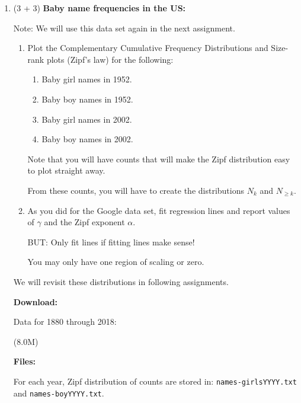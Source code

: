 \begin{enumerate}

   \solutionend


 
\item (3 + 3) 
  \textbf{Baby name frequencies in the US:}

  Note: We will use this data set again in the next assignment.

  \begin{enumerate}
  \item 
    Plot the Complementary Cumulative Frequency Distributions and Size-rank plots (Zipf's law)
    for the following:

    \begin{enumerate}
    \item
      Baby girl names in 1952.
    \item
      Baby boy names in 1952.
    \item
      Baby girl names in 2002.
    \item
      Baby boy names in 2002.
    \end{enumerate}

    Note that you will have counts that will make the Zipf distribution
    easy to plot straight away.

    From these counts,
    you will have to create
    the distributions 
    $N_{k}$ and $N_{\ge k}$.

  \item

    As you did for the Google data set, fit regression lines
    and report values of
    $\gamma$
    and
    the Zipf exponent $\alpha$.

    BUT: Only fit lines if fitting lines make sense!

    You may only have one region of scaling or zero.

  \end{enumerate}

  We will revisit these distributions in following assignments.

  \textbf{Download:}

  Data for 1880 through 2018:

   (8.0M)

  \textbf{Files:}
  
  For each year, Zipf distribution of counts are stored in:
  \texttt{names-girlsYYYY.txt}
  and 
  \texttt{names-boyYYYY.txt}.


\end{enumerate}
